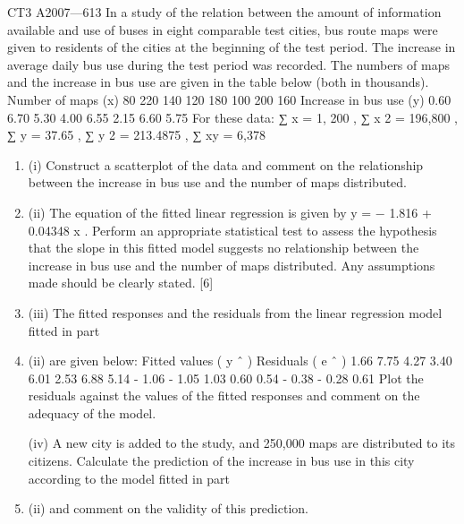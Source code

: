 \documentclass[a4paper,12pt]{article}
\begin{document}
CT3 A2007—613
In a study of the relation between the amount of information available and use of
buses in eight comparable test cities, bus route maps were given to residents of the cities at the beginning of the test period. The increase in average daily bus use during the test period was recorded. The numbers of maps and the increase in bus use are
given in the table below (both in thousands).
Number of maps (x)
80 220 140 120 180 100 200 160
Increase in bus use (y) 0.60 6.70 5.30 4.00 6.55 2.15 6.60 5.75
For these data:
∑ x = 1, 200 , ∑ x 2 = 196,800 , ∑ y = 37.65 , ∑ y 2 = 213.4875 , ∑ xy = 6,378
\begin{enumerate}
\item (i) Construct a scatterplot of the data and comment on the relationship between the increase in bus use and the number of maps distributed.

\item (ii) The equation of the fitted linear regression is given by y = − 1.816 + 0.04348 x .
Perform an appropriate statistical test to assess the hypothesis that the slope in this fitted model suggests no relationship between the increase in bus use and the number of maps distributed. Any assumptions made should be clearly
stated.
[6]
\item (iii) The fitted responses and the residuals from the linear regression model fitted
in part \item (ii) are given below:
Fitted values ( y ˆ )
Residuals ( e ˆ )
1.66 7.75 4.27 3.40 6.01 2.53 6.88 5.14
- 1.06 - 1.05 1.03 0.60 0.54 - 0.38 - 0.28 0.61
Plot the residuals against the values of the fitted responses and comment on
the adequacy of the model.

(iv)
A new city is added to the study, and 250,000 maps are distributed to its
citizens.
Calculate the prediction of the increase in bus use in this city according to the model fitted in part \item (ii) and comment on the validity of this prediction.
\end{enumerate}

\newpage
\end{document}
